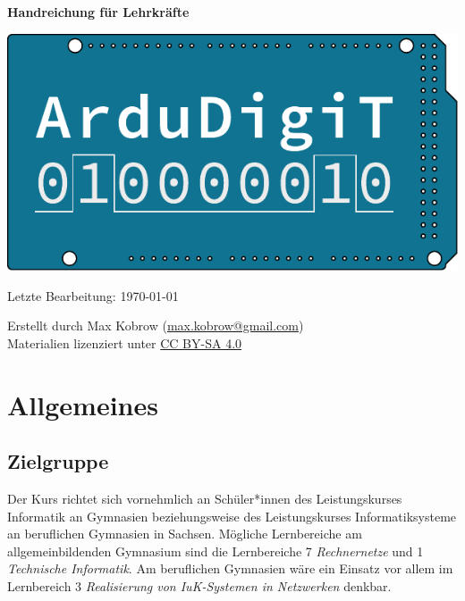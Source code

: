 \documentclass[a4paper]{article}
\begin{document}
\thispagestyle{empty}
\begin{center}
    \vspace*{5cm}

    \textbf{\Huge Handreichung für Lehrkräfte}

    \vspace*{2cm}

    \includegraphics[scale=1]{images/ArduDigiT_Logo_quer_farbig.pdf}

    \vspace*{1cm}

    Letzte Bearbeitung: \today

    \vfill

    Erstellt durch Max Kobrow (\href{mailto:max.kobrow@gmail.com}{max.kobrow@gmail.com}) \\
    Materialien lizenziert unter \href{https://creativecommons.org/licenses/by-sa/4.0/deed.de}{CC BY-SA 4.0 \ccbysa}
\end{center}
\pagebreak
\setcounter{page}{1}

\setcounter{tocdepth}{2}
\tableofcontents

\section{Allgemeines}
\subsection{Zielgruppe}
Der Kurs richtet sich vornehmlich an Schüler*innen des Leistungskurses Informatik an Gymnasien beziehungsweise des Leistungskurses Informatiksysteme an beruflichen Gymnasien in Sachsen. Mögliche Lernbereiche am allgemeinbildenden Gymnasium sind die Lernbereiche 7 \emph{Rechnernetze} und 1 \emph{Technische Informatik}. Am beruflichen Gymnasien wäre ein Einsatz vor allem im Lernbereich 3 \emph{Realisierung von IuK-Systemen in Netzwerken} denkbar.
\end{document}
